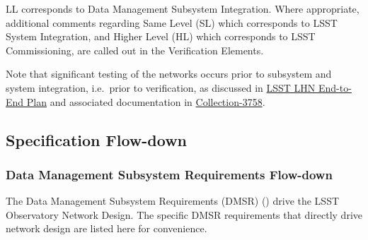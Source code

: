 \documentclass[DM,lsstdraft,STS,toc]{lsstdoc}
\begin{document}
LL corresponds to Data Management Subsystem Integration.
Where appropriate, additional comments regarding Same Level (SL) which corresponds to LSST System Integration, and Higher Level (HL) which corresponds to LSST Commissioning, are called out in the Verification Elements.

Note that significant testing of the networks occurs prior to subsystem and system integration, i.e.\  prior to verification, as discussed in \href{https://ls.st/document-14789}{LSST LHN End-to-End Plan} and associated documentation in \href{https://docushare.lsstcorp.org/docushare/dsweb/View/Collection-3758}{Collection-3758}.

\subsection{Specification Flow-down}\label{sec:sepcflowd}

\subsubsection{Data Management Subsystem Requirements Flow-down}\label{sec:dmreqflowd}

The Data Management Subsystem Requirements (DMSR) () drive the LSST Observatory Network Design.
The specific DMSR requirements that directly drive network design are listed here for convenience.
\end{document}

